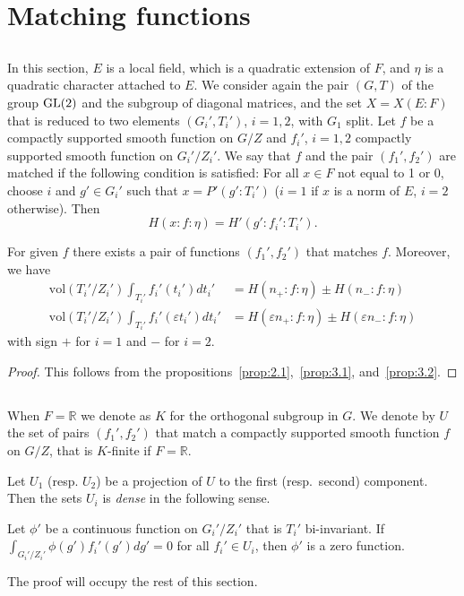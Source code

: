 \section{Matching functions}

\subsection{}
In this section, $E$ is a local field, which is a quadratic extension of $F$, and $\eta$ is a quadratic character attached to $E$.
We consider again the pair $(G, T)$ of the group $\mathrm{GL}(2)$ and the subgroup of diagonal matrices, and the set $X = X(E:F)$ that is reduced to two elements $(G_i', T_i')$, $i =1, 2$, with $G_1$ split.
Let $f$ be a compactly supported smooth function on $G/Z$ and $f_i'$, $i=1, 2$ compactly supported smooth function on $G_i' /Z_i'$.
We say that $f$ and the pair $(f_1', f_2')$ are matched if the following condition is satisfied:
For all $x \in F$ not equal to 1 or 0, choose $i$ and $g' \in G_i'$ such that $x = P'(g':T_i')$ ($i=1$ if $x$ is a norm of $E$, $i=2$ otherwise). Then
\[
H(x:f:\eta) = H'(g':f_i':T_i').
\]
\begin{proposition}\label{prop:4.1}
For given $f$ there exists a pair of functions $(f_1', f_2')$ that matches $f$.
Moreover, we have
\begin{align*}
    \mathrm{vol}(T_i' / Z_i') \int_{T_i'} f_i'(t_i') dt_i' &= H(n_+:f:\eta) \pm H(n_-:f:\eta) \\
    \mathrm{vol}(T_i' / Z_i') \int_{T_i'} f_i'(\varepsilon t_i') dt_i' &= H(\varepsilon n_+:f:\eta) \pm H(\varepsilon n_-:f:\eta)
\end{align*}
with sign $+$ for $i=1$ and $-$ for $i = 2$.
\end{proposition}
\begin{proof}
This follows from the propositions~\ref{prop:2.1},~\ref{prop:3.1}, and~\ref{prop:3.2}.
\end{proof}

\subsection{}
When $F = \mathbb{R}$ we denote as $K$ for the orthogonal subgroup in $G$.
We denote by $U$ the set of pairs $(f_1', f_2')$ that match a compactly supported smooth function $f$ on $G/Z$, that is $K$-finite if $F = \mathbb{R}$.

Let $U_1$ (resp. $U_2$) be a projection of $U$ to the first (resp.\ second) component.
Then the sets $U_i$ is \emph{dense} in the following sense.
\begin{proposition}\label{prop:4.2}
    Let $\phi'$ be a continuous function on $G_i' / Z_i'$ that is $T_i'$ bi-invariant. 
    If $\int_{G_i' / Z_i'} \phi(g') f_i'(g') dg' = 0$ for all $f_i' \in U_i$, then $\phi'$ is a zero function.
\end{proposition}
The proof will occupy the rest of this section.

